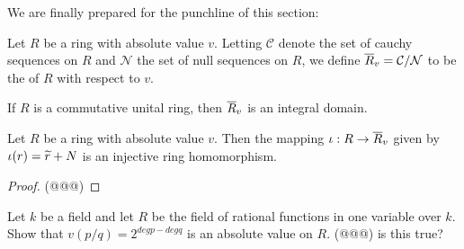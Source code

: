 We are finally prepared for the punchline of this section:

\begin{dfn}
Let \(R\) be a ring with absolute value \(v\). Letting \(\mathcal{C}\) denote the set of cauchy sequences on \(R\) and \(\mathcal{N}\) the set of null sequences on \(R\), we define \(\overline{R}_{v} = \mathcal{C}/\mathcal{N}\) to be the  of \(R\) with respect to \(v\).
\end{dfn}

\begin{prop}
\begin{proplist}
\item If \(R\) is a commutative unital ring, then \(\overline{R}_{v}\) is an integral domain.
\item Let \(R\) be a ring with absolute value \(v\). Then the mapping \(\iota : R \rightarrow \overline{R}_{v}\) given by \(\iota(r) = \widetilde{r} + N\) is an injective ring homomorphism.
\end{proplist}
\end{prop}

\begin{proof}
(@@@)
\end{proof}

\begin{exercise}
Let \(k\) be a field and let \(R\) be the field of rational functions in one variable over \(k\). Show that \(v(p/q) = 2^{deg p - deg q}\) is an absolute value on \(R\). (@@@) is this true?
\end{exercise}
